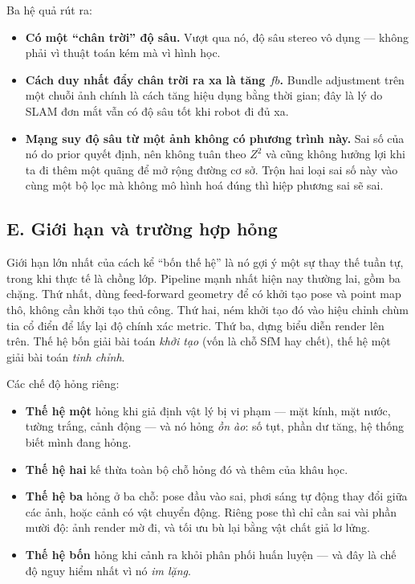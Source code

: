 \documentclass[../../../deep_learning.tex]{subfiles}
\begin{document}
Ba hệ quả rút ra:
\begin{itemize}
\item \textbf{Có một ``chân trời'' độ sâu.} Vượt qua nó, độ sâu stereo vô dụng --- không phải vì thuật toán kém mà vì hình học.
\item \textbf{Cách duy nhất đẩy chân trời ra xa là tăng \(fb\).} Bundle adjustment trên một chuỗi ảnh chính là cách tăng  hiệu dụng bằng thời gian; đây là lý do SLAM đơn mắt vẫn có độ sâu tốt khi robot đi đủ xa.
\item \textbf{Mạng suy độ sâu từ một ảnh không có phương trình này.} Sai số của nó do prior quyết định, nên không tuân theo \(Z^{2}\) và cũng không hưởng lợi khi ta đi thêm một quãng để mở rộng đường cơ sở. Trộn hai loại sai số này vào cùng một bộ lọc mà không mô hình hoá đúng thì hiệp phương sai sẽ sai.
\end{itemize}

\subsection{E. Giới hạn và trường hợp hỏng}
Giới hạn lớn nhất của cách kể ``bốn thế hệ'' là nó gợi ý một sự thay thế tuần tự, trong khi thực tế là chồng lớp. Pipeline mạnh nhất hiện nay thường lai, gồm ba chặng. Thứ nhất, dùng feed-forward geometry để có khởi tạo pose và point map thô, không cần khởi tạo thủ công. Thứ hai, ném khởi tạo đó vào hiệu chỉnh chùm tia cổ điển để lấy lại độ chính xác metric. Thứ ba, dựng biểu diễn render lên trên. Thế hệ bốn giải bài toán \emph{khởi tạo} (vốn là chỗ SfM hay chết), thế hệ một giải bài toán \emph{tinh chỉnh}.

Các chế độ hỏng riêng:
\begin{itemize}
\item \textbf{Thế hệ một} hỏng khi giả định vật lý bị vi phạm --- mặt kính, mặt nước, tường trắng, cảnh động --- và nó hỏng \emph{ồn ào}: số  tụt, phần dư tăng, hệ thống biết mình đang hỏng.
\item \textbf{Thế hệ hai} kế thừa toàn bộ chỗ hỏng đó và thêm  của khâu học.
\item \textbf{Thế hệ ba} hỏng ở ba chỗ: pose đầu vào sai, phơi sáng tự động thay đổi giữa các ảnh, hoặc cảnh có vật chuyển động. Riêng pose thì chỉ cần sai vài phần mười độ: ảnh render mờ đi, và tối ưu bù lại bằng vật chất giả lơ lửng.
\item \textbf{Thế hệ bốn} hỏng khi cảnh ra khỏi phân phối huấn luyện --- và đây là chế độ nguy hiểm nhất vì nó \emph{im lặng}.
\end{itemize}
\end{document}
